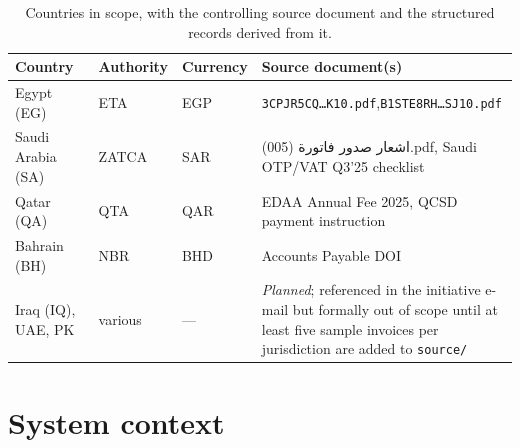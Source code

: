 \documentclass[11pt,a4paper,twoside]{report}
\newcommand{\ar}[1]{#1}
\begin{document}
\begin{table}[htbp]
\centering
\caption{Countries in scope, with the controlling source document and
         the structured records derived from it.}
\label{tab:countries}
\small
\begin{tabularx}{\linewidth}{@{}l l l X@{}}
\toprule
\textbf{Country} & \textbf{Authority} & \textbf{Currency} &
\textbf{Source document(s)} \\ \midrule
Egypt (EG)  & ETA   & EGP &
  \texttt{3CPJR5CQ\ldots K10.pdf},\newline\texttt{B1STE8RH\ldots SJ10.pdf} \\
Saudi Arabia (SA) & ZATCA & SAR &
  \ar{اشعار صدور فاتورة} (005).pdf, \newline Saudi OTP/VAT Q3'25 checklist \\
Qatar (QA)  & QTA   & QAR &
  EDAA Annual Fee 2025, \newline QCSD payment instruction \\
Bahrain (BH) & NBR  & BHD &
  Accounts Payable DOI \\
Iraq (IQ), UAE, PK & various & --- &
  \emph{Planned}; referenced in the initiative e-mail but formally
  out of scope until at least five sample invoices per jurisdiction
  are added to \texttt{source/} \\ \bottomrule
\end{tabularx}
\end{table}

\section{System context}
\end{document}
